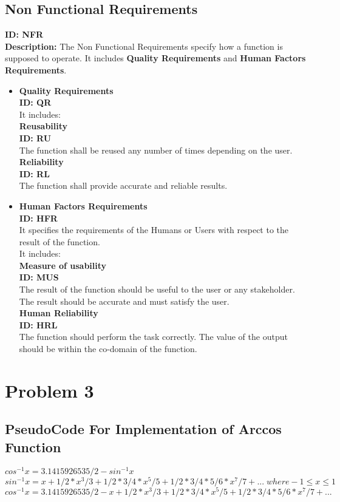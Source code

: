 \documentclass[12pt]{article}
\begin{document}
\subsection{Non Functional Requirements }
\textbf{ID: NFR}\\
\textbf{Description: }The Non Functional Requirements specify how a function is supposed to operate. It includes \textbf{Quality Requirements} and \textbf{Human Factors Requirements}.
\begin{itemize}
    \item \textbf{Quality Requirements}\\
    \textbf{ID: QR}\\It includes:\\
\textbf{Reusability\\ID: RU\\ }
The function shall be reused any number of times depending on the user.\\
\textbf{Reliability\\ID: RL\\}The function shall provide accurate and reliable results.
\end{itemize}
\begin{itemize}
    \item \textbf{Human Factors Requirements}\\
    \textbf{ID: HFR}\\It specifies the requirements of the Humans or Users with respect to the result of the function.\\ It includes:\\
\textbf{Measure of usability\\ID: MUS\\}The result of the function should be useful to the user or any stakeholder. The result should be accurate and must satisfy the user.\\
\textbf{Human Reliability\\ID: HRL\\}The function should perform the task correctly. The value of the output should be within the co-domain of the function.
\end{itemize}
\section{Problem 3}
%
\subsection{PseudoCode For Implementation of Arccos Function}
$cos^{-1}x = 3.1415926535/2 - sin^{-1}x$\\
$sin^{-1}x = x + 1/2 * x^3/3 + 1/2 *3/4 *x^5/5 + 1/2 * 3/4 *5/6 * x^7/7 + ... \;where -1\leq x\leq1$
$cos^{-1}x = 3.1415926535/2 -  x + 1/2 * x^3/3 + 1/2 *3/4 *x^5/5 + 1/2 * 3/4 *5/6 * x^7/7 + ... $
\end{document}
